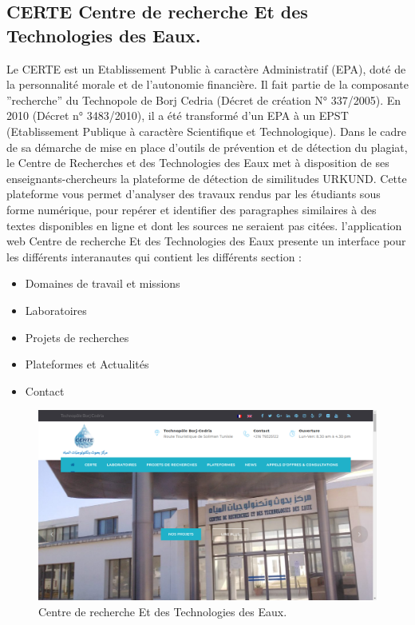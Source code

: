 \documentclass{book}
\begin{document}
\subsection*{CERTE Centre de recherche Et des Technologies des Eaux.}
Le CERTE est un Etablissement Public à caractère Administratif (EPA), doté de la personnalité morale et de l’autonomie financière. Il fait partie de la composante ”recherche” du Technopole de Borj Cedria (Décret de création N° 337/2005).  En 2010 (Décret n° 3483/2010), il a été transformé d’un EPA à un EPST (Etablissement Publique à caractère Scientifique et Technologique).
Dans le cadre de sa démarche de mise en place d’outils de prévention et de détection du plagiat, le Centre de Recherches et des Technologies des Eaux met à disposition de ses enseignants-chercheurs la plateforme de détection de similitudes URKUND.
Cette plateforme vous permet d'analyser des travaux rendus par les étudiants sous forme numérique, pour repérer et identifier des paragraphes similaires à des textes disponibles en ligne et dont les sources ne seraient pas citées.
l'application web Centre de recherche Et des Technologies des Eaux presente un interface pour les différents interanautes qui contient les différents section : 
\begin{itemize}
\item Domaines de travail et missions
\item Laboratoires 
\item Projets de recherches
\item Plateformes et Actualités 
\item Contact
\end{itemize}
\begin{figure}[h]
    \centering
    \includegraphics[width=1\textwidth]{2.png}
    \caption{Centre de recherche Et des Technologies des Eaux.}
    \label{fig:mesh1}
\end{figure}
\end{document}
